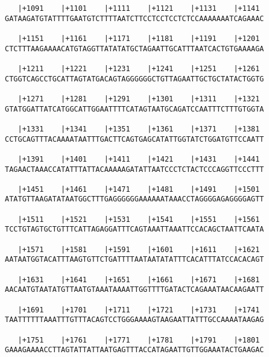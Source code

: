 \documentclass{article}
\begin{document}
\begin{Verbatim}
   |+1091    |+1101    |+1111    |+1121    |+1131    |+1141 
GATAAGATGTATTTTGAATGTCTTTTAATCTTCCTCCTCCTCTCCAAAAAAATCAGAAAC
                                                            
   |+1151    |+1161    |+1171    |+1181    |+1191    |+1201 
CTCTTTAAGAAAACATGTAGGTTATATATGCTAGAATTGCATTTAATCACTGTGAAAAGA
                                                            
   |+1211    |+1221    |+1231    |+1241    |+1251    |+1261 
CTGGTCAGCCTGCATTAGTATGACAGTAGGGGGGCTGTTAGAATTGCTGCTATACTGGTG
                                                            
   |+1271    |+1281    |+1291    |+1301    |+1311    |+1321 
GTATGGATTATCATGGCATTGGAATTTTCATAGTAATGCAGATCCAATTTCTTTGTGGTA
                                                            
   |+1331    |+1341    |+1351    |+1361    |+1371    |+1381 
CCTGCAGTTTACAAAATAATTTGACTTCAGTGAGCATATTGGTATCTGGATGTTCCAATT
                                                            
   |+1391    |+1401    |+1411    |+1421    |+1431    |+1441 
TAGAACTAAACCATATTTATTACAAAAAGATATTAATCCCTCTACTCCCAGGTTCCCTTT
                                                            
   |+1451    |+1461    |+1471    |+1481    |+1491    |+1501 
ATATGTTAAGATATAATGGCTTTGAGGGGGGAAAAAATAAACCTAGGGGAGAGGGGAGTT
                                                            
   |+1511    |+1521    |+1531    |+1541    |+1551    |+1561 
TCCTGTAGTGCTGTTTCATTAGAGGATTTCAGTAAATTAAATTCCACAGCTAATTCAATA
                                                            
   |+1571    |+1581    |+1591    |+1601    |+1611    |+1621 
AATAATGGTACATTTAAGTGTTCTGATTTTAATAATATATTTCACATTTATCCACACAGT
                                                            
   |+1631    |+1641    |+1651    |+1661    |+1671    |+1681 
AACAATGTAATATGTTAATGTAAATAAAATTGGTTTTGATACTCAGAAATAACAAGAATT
                                                            
   |+1691    |+1701    |+1711    |+1721    |+1731    |+1741 
TAATTTTTTAAATTTGTTTACAGTCCTGGGAAAAGTAAGAATTATTTGCCAAAATAAGAG
                                                            
   |+1751    |+1761    |+1771    |+1781    |+1791    |+1801 
GAAAGAAAACCTTAGTATTATTAATGAGTTTACCATAGAATTGTTGGAAATACTGAAGAC
                                                            

\end{Verbatim}
\end{document}
